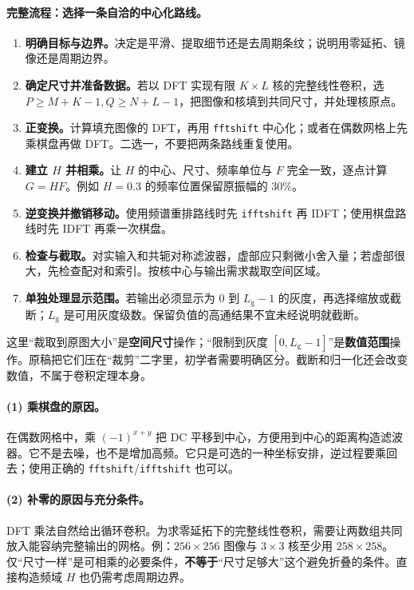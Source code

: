 \paragraph{完整流程：选择一条自洽的中心化路线。}
\begin{enumerate}[label=\arabic*.]
\item \textbf{明确目标与边界。}决定是平滑、提取细节还是去周期条纹；说明用零延拓、镜像还是周期边界。
\item \textbf{确定尺寸并准备数据。}若以 DFT 实现有限 $K\times L$ 核的完整线性卷积，选 $P\geq M+K-1,Q\geq N+L-1$，把图像和核填到共同尺寸，并处理核原点。
\item \textbf{正变换。}计算填充图像的 DFT，再用 \texttt{fftshift} 中心化；或者在偶数网格上先乘棋盘再做 DFT。二选一，不要把两条路线重复使用。
\item \textbf{建立 $H$ 并相乘。}让 $H$ 的中心、尺寸、频率单位与 $F$ 完全一致，逐点计算 $G=HF$。例如 $H=0.3$ 的频率位置保留原振幅的 $30\%$。
\item \textbf{逆变换并撤销移动。}使用频谱重排路线时先 \texttt{ifftshift} 再 IDFT；使用棋盘路线时先 IDFT 再乘一次棋盘。
\item \textbf{检查与截取。}对实输入和共轭对称滤波器，虚部应只剩微小舍入量；若虚部很大，先检查配对和索引。按核中心与输出需求裁取空间区域。
\item \textbf{单独处理显示范围。}若输出必须显示为 $0$ 到 $L_{\mathrm g}-1$ 的灰度，再选择缩放或截断；$L_{\mathrm g}$ 是可用灰度级数。保留负值的高通结果不宜未经说明就截断。
\end{enumerate}

这里“裁取到原图大小”是\textbf{空间尺寸}操作；“限制到灰度 $[0,L_{\mathrm g}-1]$”是\textbf{数值范围}操作。原稿把它们压在“裁剪”二字里，初学者需要明确区分。截断和归一化还会改变数值，不属于卷积定理本身。

\paragraph{(1) 乘棋盘的原因。}
在偶数网格中，乘 $(-1)^{x+y}$ 把 DC 平移到中心，方便用到中心的距离构造滤波器。它不是去噪，也不是增加高频。它只是可选的一种坐标安排，逆过程要乘回去；使用正确的 \texttt{fftshift}/\texttt{ifftshift} 也可以。

\paragraph{(2) 补零的原因与充分条件。}
DFT 乘法自然给出循环卷积。为求零延拓下的完整线性卷积，需要让两数组共同放入能容纳完整输出的网格。例：$256\times256$ 图像与 $3\times3$ 核至少用 $258\times258$。仅“尺寸一样”是可相乘的必要条件，\textbf{不等于}“尺寸足够大”这个避免折叠的条件。直接构造频域 $H$ 也仍需考虑周期边界。

